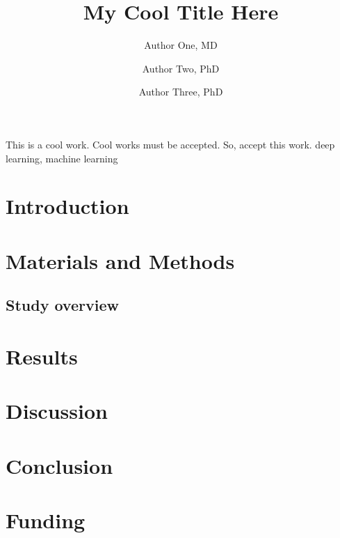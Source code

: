 \documentclass[twocolumn, 8pt]{article}
\title{My Cool Title Here}
\author[1, 2]{Author One, MD}
\author[2]{Author Two, PhD}
\author[1]{Author Three, PhD}
\affil[1]{Institution One, Country;}
\affil[2]{Institution Two, Country}
\date{}
\begin{document}
\maketitleAndAbstractSection
    {This is a cool work. Cool works must be accepted. So, accept this work.} %
    {} %
    {} %
    {} %
    {} %
    {deep learning, machine learning} %


\section*{Introduction}
\lipsum[3-4] \cite{he2016deep}

\section*{Materials and Methods}
\subsection*{Study overview}
\lipsum[3-5]

\section*{Results}
\lipsum[3-4]

\section*{Discussion}
\lipsum[3-6]

\section*{Conclusion}
\lipsum[3-4]

\section*{Funding}
\lipsum[3-4]


{\footnotesize }
\end{document}

